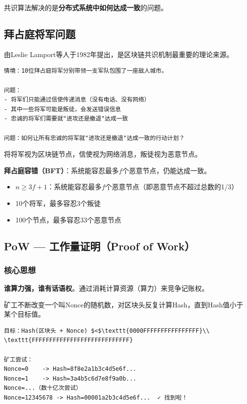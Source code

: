 ﻿\documentclass[12pt,a4paper]{article}
\begin{document}
共识算法解决的是\textbf{分布式系统中如何达成一致}的问题。

\subsection{拜占庭将军问题}

由Leslie Lamport等人于1982年提出，是区块链共识机制最重要的理论来源。

\begin{lstlisting}
情境：10位拜占庭将军分别带领一支军队包围了一座敌人城市。

问题：
- 将军们只能通过信使传递消息（没有电话、没有网络）
- 其中一些将军可能是叛徒，会发送错误信息
- 忠诚的将军们需要就"进攻还是撤退"达成一致

问题：如何让所有忠诚的将军就"进攻还是撤退"达成一致的行动计划？
\end{lstlisting}

将将军视为区块链节点，信使视为网络消息，叛徒视为恶意节点。

\begin{theorybox}
\textbf{拜占庭容错（BFT）}：系统能容忍最多$f$个恶意节点，仍能达成一致。

\begin{itemize}
\item $n \geq 3f + 1$：系统能容忍最多$f$个恶意节点（即恶意节点不超过总数的1/3）
\item 10个将军，最多容忍3个叛徒
\item 100个节点，最多容忍33个恶意节点
\end{itemize}
\end{theorybox}

\subsection{PoW — 工作量证明（Proof of Work）}

\subsubsection{核心思想}

\textbf{谁算力强，谁有话语权}。通过消耗计算资源（算力）来竞争记账权。

矿工不断改变一个叫Nonce的随机数，对区块头反复计算Hash，直到Hash值小于某个目标值。

\begin{lstlisting}
目标：Hash(区块头 + Nonce) $<$\texttt{0000FFFFFFFFFFFFFFFF}\\ \texttt{FFFFFFFFFFFFFFFFFFFFFFFFFFFF}

矿工尝试：
Nonce=0    -> Hash=8f8e2a1b3c4d5e6f...
Nonce=1    -> Hash=3a4b5c6d7e8f9a0b...
Nonce=...（数十亿次尝试）
Nonce=12345678 -> Hash=00001a2b3c4d5e6f...  ✓ 找到啦！
\end{lstlisting}
\end{document}
